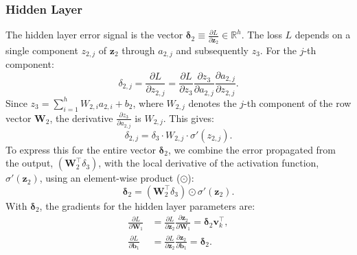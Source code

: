 \documentclass[%
  reprint,
  superscriptaddress,
  showpacs,
  showkeys,
  amsmath,amssymb,
  pra,
  longbibliography,
  floatfix,
  x11names
]{revtex4-2}
\begin{document}
\subsubsection{Hidden Layer}
The hidden layer error signal is the vector $\bm{\delta}_2 \equiv \frac{\partial L}{\partial \bm{z}_2} \in \mathbb{R}^h$. The loss $L$ depends on a single component $z_{2,j}$ of $\bm{z}_2$ through $a_{2,j}$ and subsequently $z_3$. For the $j$-th component:
\begin{equation}
\delta_{2,j} = \frac{\partial L}{\partial z_{2,j}} = \frac{\partial L}{\partial z_3} \frac{\partial z_3}{\partial a_{2,j}} \frac{\partial a_{2,j}}{\partial z_{2,j}}.
\end{equation}
Since $z_3 = \sum_{i=1}^h W_{2,i}a_{2,i} + b_2$, where $W_{2,j}$ denotes the $j$-th component of the row vector $\bm{W}_2$, the derivative $\frac{\partial z_3}{\partial a_{2,j}}$ is $W_{2,j}$. This gives:
\begin{equation}
\delta_{2,j} = \delta_3 \cdot W_{2,j} \cdot \sigma'(z_{2,j}).
\end{equation}
To express this for the entire vector $\bm{\delta}_2$, we combine the error propagated from the output, $(\bm{W}_2^\intercal \delta_3)$, with the local derivative of the activation function, $\sigma'(\bm{z}_2)$, using an element-wise product ($\odot$):
\begin{equation}
\bm{\delta}_2 = (\bm{W}_2^\intercal \delta_3) \odot \sigma'(\bm{z}_2).
\end{equation}
With $\bm{\delta}_2$, the gradients for the hidden layer parameters are:
\begin{align}
\frac{\partial L}{\partial \bm{W}_1} &= \frac{\partial L}{\partial \bm{z}_2} \frac{\partial \bm{z}_2}{\partial \bm{W}_1} = \bm{\delta}_2 \bm{v}_k^\intercal, \\
\frac{\partial L}{\partial \bm{b}_1} &= \frac{\partial L}{\partial \bm{z}_2} \frac{\partial \bm{z}_2}{\partial \bm{b}_1} = \bm{\delta}_2.
\end{align}
\end{document}
